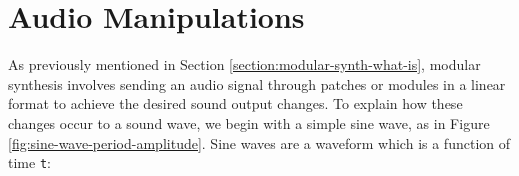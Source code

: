 %
%
%
%

\section{Audio Manipulations}
As previously mentioned in Section \ref{section:modular-synth-what-is}, modular synthesis involves sending an audio signal through patches or modules in a linear format to achieve the desired sound output changes. To explain how these changes occur to a sound wave, we begin with a simple sine wave, as in Figure \ref{fig:sine-wave-period-amplitude}. Sine waves are a waveform which is a function of time \texttt{t}:

